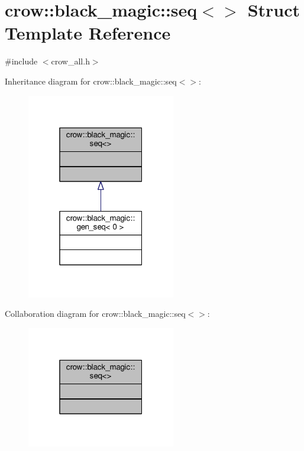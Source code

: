 \hypertarget{structcrow_1_1black__magic_1_1seq}{\section{crow\-:\-:black\-\_\-magic\-:\-:seq$<$$>$ Struct Template Reference}
\label{structcrow_1_1black__magic_1_1seq}
}


{\ttfamily \#include $<$crow\-\_\-all.\-h$>$}



Inheritance diagram for crow\-:\-:black\-\_\-magic\-:\-:seq$<$$>$\-:
\nopagebreak
\begin{figure}[H]
\begin{center}
\leavevmode
\includegraphics[width=184pt]{structcrow_1_1black__magic_1_1seq__inherit__graph}
\end{center}
\end{figure}


Collaboration diagram for crow\-:\-:black\-\_\-magic\-:\-:seq$<$$>$\-:
\nopagebreak
\begin{figure}[H]
\begin{center}
\leavevmode
\includegraphics[width=184pt]{structcrow_1_1black__magic_1_1seq__coll__graph}
\end{center}
\end{figure}
